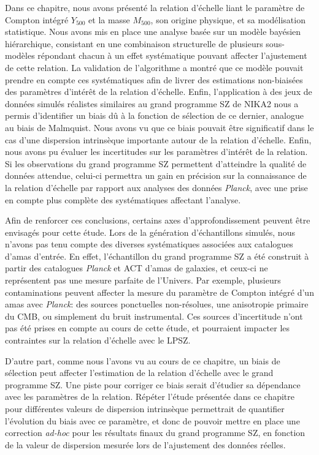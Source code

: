 Dans ce chapitre, nous avons présenté la relation d'échelle liant le paramètre de Compton intégré $Y_{500}$ et la masse $M_{500}$, son origine physique, et sa modélisation statistique.
Nous avons mis en place une analyse basée sur un modèle bayésien hiérarchique, consistant en une combinaison structurelle de plusieurs sous-modèles répondant chacun à un effet systématique pouvant affecter l'ajustement de cette relation.
La validation de l'algorithme a montré que ce modèle pouvait prendre en compte ces systématiques afin de livrer des estimations non-biaisées des paramètres d'intérêt de la relation d'échelle.
Enfin, l'application à des jeux de données simulés réalistes similaires au grand programme SZ de NIKA2 nous a permis d'identifier un biais dû à la fonction de sélection de ce dernier, analogue au biais de Malmquist.
Nous avons vu que ce biais pouvait être significatif dans le cas d'une dispersion intrinsèque importante autour de la relation d'échelle.
Enfin, nous avons pu évaluer les incertitudes sur les paramètres d'intérêt de la relation.
Si les observations du grand programme SZ permettent d'atteindre la qualité de données attendue, celui-ci permettra un gain en précision sur la connaissance de la relation d'échelle par rapport aux analyses des données \textit{Planck}, avec une prise en compte plus complète des systématiques affectant l'analyse.

Afin de renforcer ces conclusions, certains axes d'approfondissement peuvent être envisagés pour cette étude.
Lors de la génération d'échantillons simulés, nous n'avons pas tenu compte des diverses systématiques associées aux catalogues d'amas d'entrée.
En effet, l'échantillon du grand programme SZ a été construit à partir des catalogues \textit{Planck} et ACT d'amas de galaxies, et ceux-ci ne représentent pas une mesure parfaite de l'Univers.
Par exemple, plusieurs contaminations peuvent affecter la mesure du paramètre de Compton intégré d'un amas avec \textit{Planck}: des sources ponctuelles non-résolues, une anisotropie primaire du CMB, ou simplement du bruit instrumental.
Ces sources d'incertitude n'ont pas été prises en compte au cours de cette étude, et pourraient impacter les contraintes sur la relation d'échelle avec le LPSZ.

D'autre part, comme nous l'avons vu au cours de ce chapitre, un biais de sélection peut affecter l'estimation de la relation d'échelle avec le grand programme SZ.
Une piste pour corriger ce biais serait d'étudier sa dépendance avec les paramètres de la relation.
Répéter l'étude présentée dans ce chapitre pour différentes valeurs de dispersion intrinsèque permettrait de quantifier l'évolution du biais avec ce paramètre, et donc de pouvoir mettre en place une correction \textit{ad-hoc} pour les résultats finaux du grand programme SZ, en fonction de la valeur de dispersion mesurée lors de l'ajustement des données réelles.

